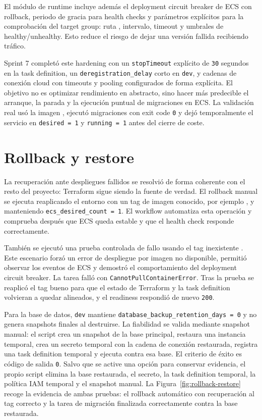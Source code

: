 El módulo de runtime incluye además el deployment circuit breaker de ECS con rollback, periodo de gracia para health checks y parámetros explícitos para la comprobación del target group: ruta , intervalo, timeout y umbrales de healthy/unhealthy. Esto reduce el riesgo de dejar una versión fallida recibiendo tráfico.

Sprint 7 completó este hardening con un \texttt{stopTimeout} explícito de \texttt{30} segundos en la task definition, un \texttt{deregistration\_delay} corto en \texttt{dev}, y cadenas de conexión cloud con timeouts y pooling configurados de forma explícita. El objetivo no es optimizar rendimiento en abstracto, sino hacer más predecible el arranque, la parada y la ejecución puntual de migraciones en ECS. La validación real usó la imagen , ejecutó migraciones con exit code \texttt{0} y dejó temporalmente el servicio en \texttt{desired = 1} y \texttt{running = 1} antes del cierre de coste.

\section{Rollback y restore}
\label{sec:rollback-restore}

La recuperación ante despliegues fallidos se resolvió de forma coherente con el resto del proyecto: Terraform sigue siendo la fuente de verdad. El rollback manual se ejecuta reaplicando el entorno con un tag de imagen conocido, por ejemplo , y manteniendo \texttt{ecs\_desired\_count = 1}. El workflow  automatiza esta operación y comprueba después que ECS queda estable y que el health check responde correctamente.

También se ejecutó una prueba controlada de fallo usando el tag inexistente . Este escenario forzó un error de despliegue por imagen no disponible, permitió observar los eventos de ECS y demostró el comportamiento del deployment circuit breaker. La tarea falló con \texttt{CannotPullContainerError}. Tras la prueba se reaplicó el tag bueno  para que el estado de Terraform y la task definition volvieran a quedar alineados, y el readiness respondió de nuevo \texttt{200}.

Para la base de datos, \texttt{dev} mantiene \texttt{database\_backup\_retention\_days = 0} y no genera snapshots finales al destruirse. La fiabilidad se valida mediante snapshot manual: el script  crea un snapshot de la base principal, restaura una instancia temporal, crea un secreto temporal con la cadena de conexión restaurada, registra una task definition temporal y ejecuta  contra esa base. El criterio de éxito es código de salida \texttt{0}. Salvo que se active una opción para conservar evidencia, el propio script elimina la base restaurada, el secreto, la task definition temporal, la política IAM temporal y el snapshot manual. La Figura~\ref{fig:rollback-restore} recoge la evidencia de ambas pruebas: el rollback automático con recuperación al tag correcto y la tarea de migración finalizada correctamente contra la base restaurada.

